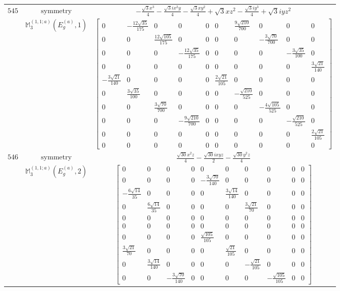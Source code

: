 \documentclass[fleqn,8pt,landscape]{jsarticle}
\begin{document}
\begin{longtable}{ccc}
$ 545 $ & $ \text{symmetry} $ & $ - \frac{\sqrt{3} x^{3}}{4} - \frac{\sqrt{3} i x^{2} y}{4} - \frac{\sqrt{3} x y^{2}}{4} + \sqrt{3} x z^{2} - \frac{\sqrt{3} i y^{3}}{4} + \sqrt{3} i y z^{2} $ \\
$  $ & $ \mathbb{M}_{3}^{(1,1;a)}(E_{g}^{(a)},1) $ & $ \begin{bmatrix} 0 & - \frac{12 \sqrt{35}}{175} & 0 & 0 & 0 & 0 & \frac{9 \sqrt{210}}{700} & 0 & 0 & 0 \\ 0 & 0 & \frac{12 \sqrt{105}}{175} & 0 & 0 & 0 & 0 & - \frac{3 \sqrt{70}}{700} & 0 & 0 \\ 0 & 0 & 0 & - \frac{12 \sqrt{35}}{175} & 0 & 0 & 0 & 0 & - \frac{3 \sqrt{35}}{100} & 0 \\ 0 & 0 & 0 & 0 & 0 & 0 & 0 & 0 & 0 & \frac{3 \sqrt{21}}{140} \\ - \frac{3 \sqrt{21}}{140} & 0 & 0 & 0 & 0 & \frac{2 \sqrt{21}}{105} & 0 & 0 & 0 & 0 \\ 0 & \frac{3 \sqrt{35}}{100} & 0 & 0 & 0 & 0 & - \frac{\sqrt{210}}{525} & 0 & 0 & 0 \\ 0 & 0 & \frac{3 \sqrt{70}}{700} & 0 & 0 & 0 & 0 & - \frac{4 \sqrt{105}}{525} & 0 & 0 \\ 0 & 0 & 0 & - \frac{9 \sqrt{210}}{700} & 0 & 0 & 0 & 0 & - \frac{\sqrt{210}}{525} & 0 \\ 0 & 0 & 0 & 0 & 0 & 0 & 0 & 0 & 0 & \frac{2 \sqrt{21}}{105} \\ 0 & 0 & 0 & 0 & 0 & 0 & 0 & 0 & 0 & 0 \end{bmatrix} $ \\ \hline
$ 546 $ & $ \text{symmetry} $ & $ \frac{\sqrt{30} x^{2} z}{4} - \frac{\sqrt{30} i x y z}{2} - \frac{\sqrt{30} y^{2} z}{4} $ \\
$  $ & $ \mathbb{M}_{3}^{(1,1;a)}(E_{g}^{(a)},2) $ & $ \begin{bmatrix} 0 & 0 & 0 & 0 & 0 & 0 & 0 & 0 & 0 & 0 \\ 0 & 0 & 0 & 0 & - \frac{3 \sqrt{70}}{140} & 0 & 0 & 0 & 0 & 0 \\ - \frac{6 \sqrt{14}}{35} & 0 & 0 & 0 & 0 & \frac{3 \sqrt{14}}{140} & 0 & 0 & 0 & 0 \\ 0 & \frac{6 \sqrt{14}}{35} & 0 & 0 & 0 & 0 & \frac{3 \sqrt{21}}{70} & 0 & 0 & 0 \\ 0 & 0 & 0 & 0 & 0 & 0 & 0 & 0 & 0 & 0 \\ 0 & 0 & 0 & 0 & 0 & 0 & 0 & 0 & 0 & 0 \\ 0 & 0 & 0 & 0 & \frac{\sqrt{105}}{105} & 0 & 0 & 0 & 0 & 0 \\ \frac{3 \sqrt{21}}{70} & 0 & 0 & 0 & 0 & \frac{\sqrt{21}}{105} & 0 & 0 & 0 & 0 \\ 0 & \frac{3 \sqrt{14}}{140} & 0 & 0 & 0 & 0 & - \frac{\sqrt{21}}{105} & 0 & 0 & 0 \\ 0 & 0 & - \frac{3 \sqrt{70}}{140} & 0 & 0 & 0 & 0 & - \frac{\sqrt{105}}{105} & 0 & 0 \end{bmatrix} $ \\ \hline

\end{longtable}
\end{document}
